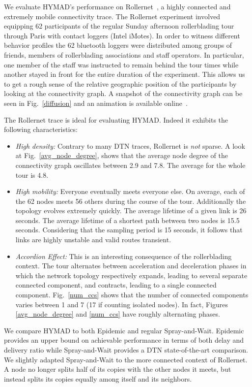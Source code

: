 \documentclass[10pt,twocolumn,letterpaper]{article}
\begin{document}
We evaluate HYMAD's performance on
Rollernet~\cite{tournoux08_rollernet}, a highly connected and
extremely mobile connectivity trace. The Rollernet experiment involved
equipping 62 participants of the regular Sunday afternoon rollerblading
tour through Paris with contact loggers (Intel iMotes). In order to
witness different behavior profiles the 62 bluetooth loggers were
distributed among groups of friends, members of rollerblading
associations and staff operators. In particular, one member of the
staff was instructed to remain behind the tour times while another
stayed in front for the entire duration of the experiment. This allows
us to get a rough sense of the relative geographic position of the
participants by looking at the connectivity graph. A snapshot of the
connectivity graph can be seen in Fig.~\ref{diffusion} and an
animation is available online~\cite{rollernet_youtube}.

The Rollernet trace is ideal for evaluating HYMAD. Indeed it exhibits
the following characteristics:
\begin{itemize}
\item \emph{High density:} Contrary to many DTN traces, Rollernet is
  \emph{not} sparse. A look at Fig.~\ref{avg_node_degree}, shows that
  the average node degree of the connectivity graph oscillates between
  2.9 and 7.8. The average for the whole tour is 4.8.
\item \emph{High mobility:} Everyone eventually meets everyone
  else. On average, each of the 62 nodes meets 56 others during the
  course of the tour. Additionally the topology evolves extremely
  quickly. The average lifetime of a given link is 26 seconds. The
  average lifetime of a shortest path between two nodes is 15.5
  seconds. Considering that the sampling period is 15 seconds, it
  follows that links are highly unstable and valid routes transient.
\item \emph{Accordion Effect:} This is an interesting consequence of
  the rollerblading context. The tour alternates between acceleration
  and deceleration phases in which the network topology respectively
  expands, leading to several separate connected component, and
  contracts, leading to a single connected
  component. Fig.~\ref{num_ccs} shows that the number of connected
  components varies between 1 and 7 (17 if counting isolated
  nodes). In fact, Figures \ref{avg_node_degree} and \ref{num_ccs} have
  roughly alternating phases.
\end{itemize}

We compare HYMAD to both Epidemic and regular Spray-and-Wait. Epidemic
provides an upper bound on achievable performance in terms of both
delay and delivery ratio while Spray-and-Wait provides a DTN
state-of-the-art comparison. We slightly adapted Spray-and-Wait to the
more connected context of Rollernet. A node no longer splits half of
its copies with the other nodes it meets, but instead splits its
copies equally among itself and its neighbors.
\end{document}
